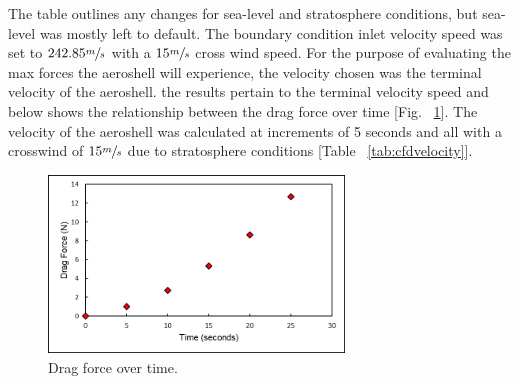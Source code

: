 \begin{table}[H]
\caption{\label{tab:cfdprojectschematic}CFD sea-level and stratosphere parameter differences.}
\centering
{}
\end{table}

\indent\indent The table outlines any changes for sea-level and stratosphere conditions, but sea-level was mostly left to default. The boundary condition inlet velocity speed was set to $242.85 \sfrac{m}{s}$ with a $15 \sfrac{m}{s}$ cross wind speed. For the purpose of evaluating the max forces the aeroshell will experience, the velocity chosen was the terminal velocity of the aeroshell. the results pertain to the terminal velocity speed and below shows the relationship between the drag force over time [Fig. ~\ref{fig:dragforce}]. The velocity of the aeroshell was calculated at increments of 5 seconds and all with a crosswind of $15 \sfrac{m}{s}$ due to stratosphere conditions [Table ~\ref{tab:cfdvelocity}].

\begin{figure}[H]
  \centering
  \includegraphics[width=0.7\textwidth]{Aeroshell/drag_relation.png}
  \caption{\label{fig:dragforce}Drag force over time.}
\end{figure}

